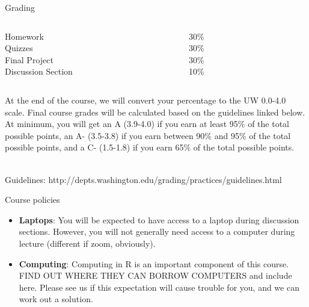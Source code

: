 \documentclass{beamer}
\begin{document}
\begin{frame}{Grading}
\begin{columns}
	\begin{column}[t]{0.4\textwidth}
		Homework \\
		Quizzes \\
		Final Project \\
		Discussion Section 
	\end{column}
	\begin{column}[t]{0.4\textwidth}  %
		30\% \\
		30\% \\
		30\% \\
		10\% 
	\end{column}
\end{columns}

\vspace{1cm}

At the end of the course, we will convert your percentage to the UW 0.0-4.0 scale. Final course grades will be calculated based on the guidelines linked below. At minimum, you will get an A (3.9-4.0) if you earn at least 95\% of the total possible points, an A- (3.5-3.8) if you earn between 90\% and 95\% of the total possible points, and a C- (1.5-1.8) if you earn 65\% of the total possible points. \\~\

Guidelines: http://depts.washington.edu/grading/practices/guidelines.html 

\end{frame}

\begin{frame}{Course policies}
\begin{itemize}
	\item \textbf{Laptops}: You will be expected to have access to a laptop during discussion sections. However, you will not generally need access to a computer during lecture (different if zoom, obviously).
	\item \textbf{Computing}: Computing in R is an important component of this course. FIND OUT WHERE THEY CAN BORROW COMPUTERS and include here. Please see us if this expectation will cause trouble for you, and we can work out a solution.
\end{itemize}
\end{frame}
\end{document}
